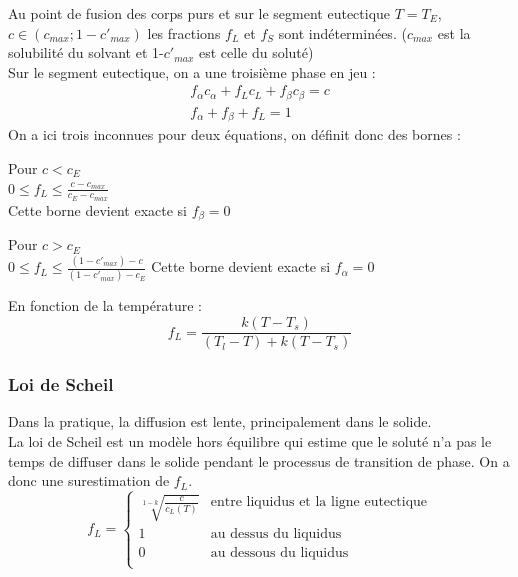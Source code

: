 \documentclass[../main.tex]{subfiles}
\begin{document}
Au point de fusion des corps purs et sur le segment eutectique $T=T_E$, $c\in(c_{max}; 1-c'_{max})$ les fractions $f_L$ et $f_S$ sont indéterminées. ($c_{max}$ est la solubilité du solvant et 1-$c'_{max}$ est celle du soluté)\\

Sur le segment eutectique, on a une troisième phase en jeu : \\
\begin{equation}
    \begin{split}
        f_\alpha c_\alpha + f_L c_L + f_\beta c_\beta = c\\
        f_\alpha + f_\beta + f_L = 1
    \end{split}
\end{equation}
On a ici trois inconnues pour deux équations, on définit donc des bornes : \\
\begin{minipage}{.5\textwidth}
    Pour $c<c_E$\\
    $0\leq f_L \leq \frac{c-c_{max}}{c_E-c_{max}}$\\
    Cette borne devient exacte si $f_\beta=0$\\
\end{minipage}
\begin{minipage}{.5\textwidth}
    Pour $c>c_E$\\
    $0\leq f_L \leq \frac{(1-c'_{max})-c}{(1-c'_{max})-c_E}$
    Cette borne devient exacte si $f_\alpha=0$\\
\end{minipage}
En fonction de la température :\\
\begin{equation}
    f_L = \frac{k(T-T_s)}{(T_l-T)+k(T-T_s)}
\end{equation}

\subsubsection{Loi de Scheil}
Dans la pratique, la diffusion est lente, principalement dans le solide.\\
La loi de Scheil est un modèle hors équilibre qui estime que le soluté n'a pas le temps de diffuser dans le solide pendant le processus de transition de phase. On a donc une surestimation de $f_L$.\\

\begin{equation}
    f_L = \begin{cases}
        \sqrt[1-k]{\frac{c}{c_L(T)}} & \text{entre liquidus et la ligne eutectique}\\
        1 & \text{au dessus du liquidus}\\
        0 & \text{au dessous du liquidus}\\
    \end{cases}
\end{equation}
\end{document}
